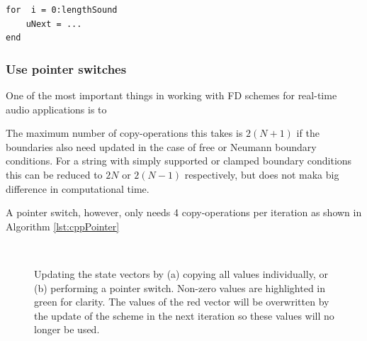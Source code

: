 \setlstMAT
\begin{lstlisting}
for  i = 0:lengthSound
    uNext = ...
end
\end{lstlisting}

\subsubsection{Use pointer switches}
One of the most important things in working with FD schemes for real-time audio applications is to 

The maximum number of copy-operations this takes is $2(N+1)$ if the boundaries also need updated in the case of free or Neumann boundary conditions. For a string with simply supported or clamped boundary conditions this can be reduced to $2N$ or $2(N-1)$ respectively, but does not maka big difference in computational time. 

A pointer switch, however, only needs 4 copy-operations per iteration as shown in Algorithm \ref{lst:cppPointer} 

\begin{figure}[h]
    \\
    \caption{Updating the state vectors by (a) copying all values individually, or (b) performing a pointer switch. Non-zero values are highlighted in green for clarity. The values of the red vector will be overwritten by the update of the scheme in the next iteration so these values will no longer be used.}
\end{figure}


